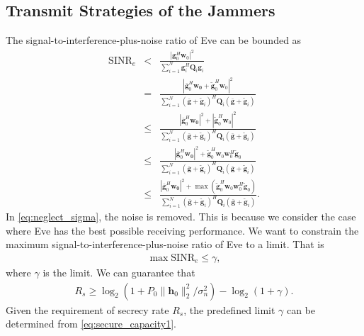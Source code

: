 \documentclass[12pt, journal,onecolumn,draftclsnofoot]{IEEEtran}
\begin{document}
\subsection{Transmit Strategies of the Jammers}
The signal-to-interference-plus-noise ratio of Eve can be bounded as
\begin{eqnarray}
\mathrm{SINR}_e & < & \frac{\left| \mathbf{g}_{0}^H\mathbf{w}_{0}\right|^2}{\sum_{i=1}^{N}\mathbf{g}_{i}^H\mathbf{Q}_{i}\mathbf{g}_i} \label{eq:neglect_sigma}\\
&=& \frac{\left|\bar{\mathbf{g}}_0^H\mathbf{w_0} + \tilde{\mathbf{g}}_0^H\mathbf{w}_0\right|^2}{\sum_{i = 1}^N(\bar{\mathbf{g}}+\tilde{\mathbf{g}}_i)^H\mathbf{Q}_i(\bar{\mathbf{g}}+\tilde{\mathbf{g}}_i)}\\
&\leq & \frac{\left|\bar{\mathbf{g}}_0^H\mathbf{w_0}\right|^2 + \left|\tilde{\mathbf{g}}_0^H\mathbf{w}_0\right|^2}{\sum_{i = 1}^N(\bar{\mathbf{g}}+\tilde{\mathbf{g}}_i)^H\mathbf{Q}_i(\bar{\mathbf{g}}+\tilde{\mathbf{g}}_i)}\\
&\leq & \frac{\left|\bar{\mathbf{g}}_0^H\mathbf{w_0}\right|^2 + \tilde{\mathbf{g}}_0^H\mathbf{w}_0\mathbf{w}_0^H\tilde{\mathbf{g}}_0}{\sum_{i = 1}^N(\bar{\mathbf{g}}+\tilde{\mathbf{g}}_i)^H\mathbf{Q}_i(\bar{\mathbf{g}}+\tilde{\mathbf{g}}_i)}\\
& \leq & \frac{\left|\bar{\mathbf{g}}_0^H\mathbf{w_0}\right|^2 + \max(\tilde{\mathbf{g}}_0^H\mathbf{w}_0\mathbf{w}_0^H\tilde{\mathbf{g}}_0)}{\sum_{i = 1}^N(\bar{\mathbf{g}}+\tilde{\mathbf{g}}_i)^H\mathbf{Q}_i(\bar{\mathbf{g}}+\tilde{\mathbf{g}}_i)} .
\label{eq:SINR_e}
\end{eqnarray}
In \eqref{eq:neglect_sigma}, the noise is removed. This is because we consider the case where Eve has the best possible receiving performance. We want to constrain the maximum signal-to-interference-plus-noise ratio of Eve to a limit. That is 
\begin{eqnarray}
\max \mathrm{SINR}_e \leq \gamma \label{eq:SINR_constraint},
\end{eqnarray} 
where $\gamma$ is the limit. We can guarantee that
\begin{eqnarray}
R_s \geq \log_2\left(1 + P_0\|\mathbf{h}_0\|_2^2/\sigma_n^2\right) - \log_2\left(1 + \gamma\right). \label{eq:secure_capacity1}
\end{eqnarray}
Given the requirement of secrecy rate $R_s$, the predefined limit $\gamma$ can be determined from \eqref{eq:secure_capacity1}.
\end{document}
